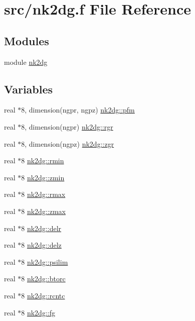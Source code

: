 \hypertarget{nk2dg_8f}{
\section{src/nk2dg.f File Reference}
\label{nk2dg_8f}
}
\subsection*{Modules}
\begin{CompactItemize}
\item 
module \hyperlink{namespacenk2dg}{nk2dg}
\end{CompactItemize}
\subsection*{Variables}
\begin{CompactItemize}
\item 
real $\ast$8, dimension(ngpr, ngpz) \hyperlink{namespacenk2dg_733992eb6e80ce656c32d6d353c4677b}{nk2dg::pfm}
\item 
real $\ast$8, dimension(ngpr) \hyperlink{namespacenk2dg_cf5c5ade5f9197d1f9a6a9730e570159}{nk2dg::rgr}
\item 
real $\ast$8, dimension(ngpz) \hyperlink{namespacenk2dg_fe36aa20b7f59d22623f4125397651d6}{nk2dg::zgr}
\item 
real $\ast$8 \hyperlink{namespacenk2dg_395609fb530be70486fc118f6f819b3a}{nk2dg::rmin}
\item 
real $\ast$8 \hyperlink{namespacenk2dg_08d442b8e9fa8d3621dbd6c09ee2b4be}{nk2dg::zmin}
\item 
real $\ast$8 \hyperlink{namespacenk2dg_72fec23caa6a548271a5e18c11a1dce9}{nk2dg::rmax}
\item 
real $\ast$8 \hyperlink{namespacenk2dg_ba6a5a016ae20d3d4055b43ed890a3b2}{nk2dg::zmax}
\item 
real $\ast$8 \hyperlink{namespacenk2dg_f992f0e8d5ad4ef0f9529778eda2cdff}{nk2dg::delr}
\item 
real $\ast$8 \hyperlink{namespacenk2dg_654247a44246ac3e92803f639aaa7007}{nk2dg::delz}
\item 
real $\ast$8 \hyperlink{namespacenk2dg_af4c53f2a1030fd743abb4a613562faa}{nk2dg::psilim}
\item 
real $\ast$8 \hyperlink{namespacenk2dg_f54459b76d986d4d7eec7446c33e6356}{nk2dg::btorc}
\item 
real $\ast$8 \hyperlink{namespacenk2dg_b8da20bfe7c672322e034214f4902319}{nk2dg::rcntc}
\item 
real $\ast$8 \hyperlink{namespacenk2dg_309a619ea56590d21043369e3f3f50e7}{nk2dg::fg}
\end{CompactItemize}
